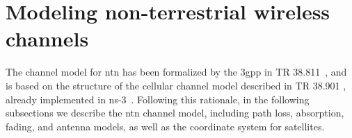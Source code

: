 



\section{Modeling non-terrestrial wireless channels}
\label{sec:channel-ntn}
The channel model for \gls{ntn} has been formalized by the \gls{3gpp} in TR 38.811~\cite{38811}, and is based on the structure of the cellular channel model described in TR 38.901 \cite{TR38901}, already implemented in ns-3~\cite{zugno20implementation}. 
Following this rationale, in the following subsections we describe the \gls{ntn} channel model, including path loss, absorption, fading, and antenna models, as well as the coordinate system for satellites. 


